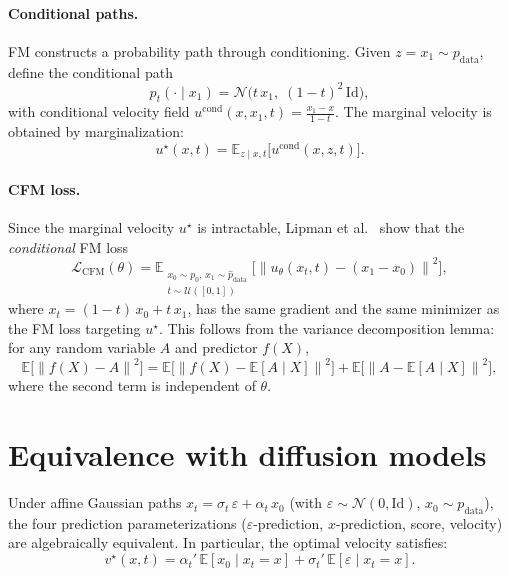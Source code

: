\documentclass[10pt,a4paper]{article}
\theoremstyle{definition}
\newcommand{\E}{\mathbb{E}}
\newcommand{\cN}{\mathcal{N}}
\newcommand{\cL}{\mathcal{L}}
\newcommand{\norm}[1]{\left\lVert #1 \right\rVert}
\newcommand{\Id}{\mathrm{Id}}
\begin{document}
\paragraph{Conditional paths.}
FM constructs a probability path through conditioning.
Given $z = x_1 \sim p_{\mathrm{data}}$, define the conditional path
\begin{equation}\label{eq:cond-path}
    p_t(\cdot \mid x_1) = \cN\!\big(t\, x_1,\; (1-t)^2\,\Id\big),
\end{equation}
with conditional velocity field $u^{\mathrm{cond}}(x, x_1, t) = \frac{x_1 - x}{1 - t}$.
The marginal velocity is obtained by marginalization:
\begin{equation}\label{eq:marginal-vel}
    u^\star(x, t) = \E_{z \mid x, t}\!\big[u^{\mathrm{cond}}(x, z, t)\big].
\end{equation}

\paragraph{CFM loss.}
Since the marginal velocity $u^\star$ is intractable, Lipman et al.~\cite{lipman2023flow} show that the \emph{conditional} FM loss
\begin{equation}\label{eq:cfm-loss}
    \cL_{\mathrm{CFM}}(\theta) = \E_{\substack{x_0 \sim p_0,\, x_1 \sim \hat{p}_{\mathrm{data}} \\ t \sim \mathcal{U}([0,1])}}\!\Big[\norm{u_\theta(x_t, t) - (x_1 - x_0)}^2\Big],
\end{equation}
where $x_t = (1-t)\,x_0 + t\,x_1$, has the same gradient and the same minimizer as the FM loss targeting $u^\star$.
This follows from the variance decomposition lemma: for any random variable $A$ and predictor $f(X)$,
\[
    \E\!\big[\norm{f(X) - A}^2\big] = \E\!\big[\norm{f(X) - \E[A \mid X]}^2\big] + \E\!\big[\norm{A - \E[A\mid X]}^2\big],
\]
where the second term is independent of $\theta$.

\section{Equivalence with diffusion models}\label{sec:equivalence}

Under affine Gaussian paths $x_t = \sigma_t\, \varepsilon + \alpha_t\, x_0$ (with $\varepsilon \sim \cN(0,\Id)$, $x_0 \sim p_{\mathrm{data}}$), the four prediction parameterizations ($\varepsilon$-prediction, $x$-prediction, score, velocity) are algebraically equivalent.
In particular, the optimal velocity satisfies:
\begin{equation}\label{eq:v-score-relation}
    v^\star(x, t) = \alpha_t'\,\E[x_0 \mid x_t = x] + \sigma_t'\,\E[\varepsilon \mid x_t = x].
\end{equation}
\end{document}

